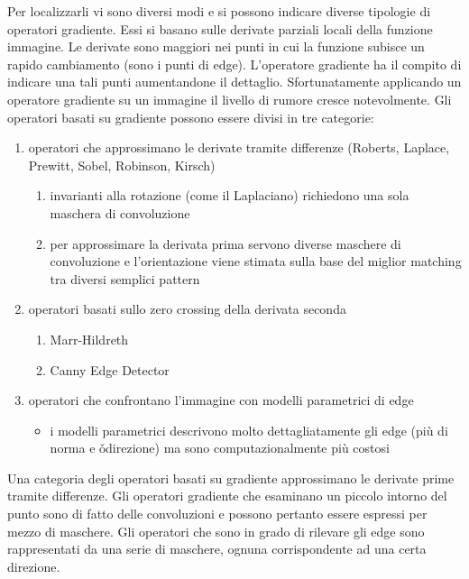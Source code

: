 Per localizzarli vi sono diversi modi e si possono indicare diverse tipologie di operatori gradiente. Essi si basano sulle derivate parziali locali della funzione immagine. Le derivate sono maggiori nei punti in cui la funzione subisce un rapido cambiamento (sono i punti di edge). L'operatore gradiente ha il compito di indicare una tali punti aumentandone il dettaglio. Sfortunatamente applicando un operatore gradiente su un immagine il livello di rumore cresce notevolmente.
Gli operatori basati su gradiente possono essere divisi in tre categorie:
\begin{enumerate}
	\item operatori	che approssimano le	derivate tramite differenze (Roberts, Laplace, Prewitt, Sobel, Robinson, Kirsch)
	\begin{enumerate}
		\item invarianti alla rotazione (come il Laplaciano) richiedono una sola maschera di convoluzione
		\item per approssimare la derivata prima servono diverse maschere di convoluzione e	l'orientazione viene stimata sulla base del miglior matching tra diversi semplici pattern
	\end{enumerate}
	
	\item operatori basati sullo zero crossing della derivata seconda
	\begin{enumerate}
		\item Marr-Hildreth
		\item Canny Edge Detector
	\end{enumerate}
	
	\item operatori che confrontano l'immagine con modelli parametrici di edge
	\begin{itemize}
		\item i modelli parametrici descrivono molto dettagliatamente gli edge (più di norma e \v{o}direzione) ma sono computazionalmente più costosi
	\end{itemize}
\end{enumerate}

Una categoria degli operatori basati su gradiente approssimano le derivate prime tramite differenze. Gli operatori gradiente che esaminano un piccolo intorno del punto sono di fatto delle convoluzioni e possono pertanto essere espressi per mezzo di maschere. Gli operatori che sono in grado di rilevare gli edge sono rappresentati da una serie di maschere, ognuna corrispondente ad una certa direzione.

